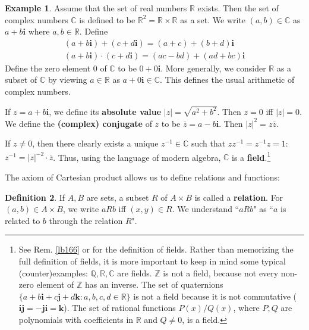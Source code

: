 \documentclass[12pt,b5paper,notitlepage]{article}
\theoremstyle{definition}
\newtheorem{df}{Definition}[section]
\newtheorem{eg}[df]{Example}
\theoremstyle{plain}
\newcommand{\ovl}{\overline}
\newcommand{\im}{\mathbf{i}}
\newcommand{\Cbb}{\mathbb C}
\newcommand{\Zbb}{\mathbb Z}
\newcommand{\Qbb}{\mathbb Q}
\newcommand{\Rbb}{\mathbb R}
\numberwithin{equation}{section}
\begin{document}
\begin{eg}
Assume that the set of real numbers $\Rbb$ exists. Then the set of complex numbers $\Cbb$ \index{C@$\Cbb$, the set of complex numbers} is defined to be $\Rbb^2=\Rbb\times\Rbb$ as a set. We write $(a,b)\in\Cbb$ as $a+b\im$ where $a,b\in\Rbb$. Define
\begin{gather*}
(a+b\im)+(c+d\im)=(a+c)+(b+d)\im\\
(a+b\im)\cdot (c+d\im)=(ac-bd)+(ad+bc)\im
\end{gather*}
Define the zero element $0$ of $\Cbb$ to be $0+0\im$. More generally, we consider $\Rbb$ as a subset of $\Cbb$ by viewing $a\in\Rbb$ as $a+0\im\in\Cbb$. This defines the usual arithmetic of complex numbers. 

If $z=a+b\im$, we define its \textbf{absolute value} $|z|=\sqrt{a^2+b^2}$. Then $z=0$ iff $|z|=0$. We define the \textbf{(complex) conjugate} of $z$ to be $\ovl z=a-b\im$. Then $|z|^2=z\ovl z$.

If $z\neq 0$, then there clearly exists a unique $z^{-1}\in\Cbb$ such that $zz^{-1}=z^{-1}z=1$:  $z^{-1}=|z|^{-2}\cdot \ovl z$. Thus, using the language of modern algebra, $\Cbb$ is a  \textbf{field}.\footnote{See Rem. \ref{lb166} or  \cite[Def. 1.12]{Rud-P} for the definition of fields. Rather than memorizing the full definition of fields, it is more important to keep in mind some typical (counter)examples: $\Qbb,\Rbb,\Cbb$ are fields. $\Zbb$ is not a field, because not every non-zero element of $\Zbb$ has an inverse. The set of quaternions $\{a+b\im+c\mathbf{j}+d\mathbf{k}: a,b,c,d\in\Rbb\}$ is not a field because it is not commutative ($\im\mathbf{j}=-\mathbf{j}\im=\mathbf{k}$). The set of rational functions $P(x)/Q(x)$, where $P,Q$ are polynomials with coefficients in $\Rbb$ and $Q\neq 0$, is a field.}  \hfill\qedsymbol
\end{eg}


The axiom of Cartesian product allows us to define relations and functions:

\begin{df}
If $A,B$ are sets, a subset $R$ of $A\times B$ is called a \textbf{relation}. For $(a,b)\in A\times B$, we write $aRb$ iff $(x,y)\in R$. We understand ``$aRb$" as ``$a$ is related to $b$ through the relation $R$".
\end{df}
\end{document}
